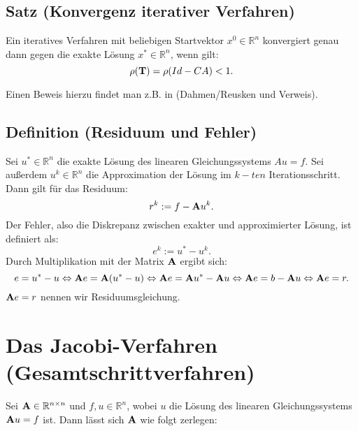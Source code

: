 \subsection{Satz (Konvergenz iterativer Verfahren)}\label{ss.Konvergenz iterativer Verfahren}

Ein iteratives Verfahren mit beliebigen Startvektor $x^{0} \in \mathbb{R}^{n}$ konvergiert genau dann gegen die exakte Lösung $x^{*} \in \mathbb{R}^{n}$, wenn gilt:
\begin{equation}
\rho({\textbf{T}}) = \rho(Id - CA) < 1.
\end{equation}

Einen Beweis hierzu findet man z.B. in (Dahmen/Reusken und Verweis).

\subsection{Definition (Residuum und Fehler)}\label{ss.Residuum und Fehler}

Sei $u^{*} \in \mathbb{R}^{n}$ die exakte Lösung des linearen Gleichungssystems $Au = f$. Sei außerdem $u^{k} \in \mathbb{R}^{n}$ die Approximation der Lösung im $k-ten$ Iterationsschritt. Dann gilt für das Residuum:
\begin{equation}
r^{k} := f - {\textbf{A}} u^{k}.\label{eq.Residuum}
\end{equation}
Der Fehler, also die Diskrepanz zwischen exakter und approximierter Lösung, ist definiert als:
\begin{equation}
e^{k} := u^{*} - u^{k}.\label{eq.Fehler}
\end{equation}
Durch Multiplikation mit der Matrix ${\textbf{A}}$ ergibt sich:
\begin{equation}
e = u^{*} - u \Leftrightarrow {\textbf{A}}e = {\textbf{A}}(u^{*} - u) \Leftrightarrow {\textbf{A}}e = {\textbf{A}} u^{*} - {\textbf{A}} u \Leftrightarrow {\textbf{A}}e = b - {\textbf{A}} u \Leftrightarrow {\textbf{A}}e = r.\label{eq.Residuumsgleichung}
\end{equation}
${\textbf{A}}e = r$ nennen wir Residuumsgleichung.

\section{Das Jacobi-Verfahren (Gesamtschrittverfahren)}\label{s.Das Jacobi-Iterationsverfahren}

Sei ${\textbf{A}} \in \mathbb{R}^{n \times n}$ und $f,u \in \mathbb{R}^{n}$, wobei $u$ die Lösung des linearen Gleichungssystems ${\textbf{A}}u = f$ ist. Dann lässt sich ${\textbf{A}}$ wie folgt zerlegen:

